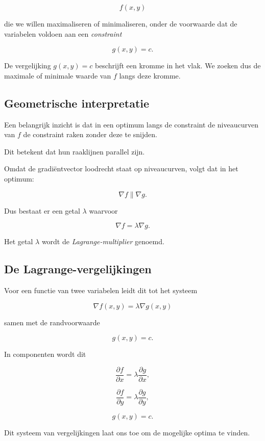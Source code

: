 \documentclass[11pt,a4paper]{article}
\begin{document}
    \[
        f(x,y)
    \]

    die we willen maximaliseren of minimaliseren,
    onder de voorwaarde dat de variabelen voldoen aan een
    \textit{constraint}

    \[
        g(x,y) = c.
    \]

    De vergelijking $g(x,y)=c$ beschrijft een kromme in het vlak.
    We zoeken dus de maximale of minimale waarde van $f$ langs deze kromme.

    \subsection{Geometrische interpretatie}

    Een belangrijk inzicht is dat in een optimum langs de constraint
    de niveaucurven van $f$ de constraint raken zonder deze te snijden.

    Dit betekent dat hun raaklijnen parallel zijn.

    Omdat de gradiëntvector loodrecht staat op niveaucurven,
    volgt dat in het optimum:

    \[
        \nabla f \parallel \nabla g.
    \]

    Dus bestaat er een getal $\lambda$ waarvoor

    \[
        \nabla f = \lambda \nabla g.
    \]

    Het getal $\lambda$ wordt de \textit{Lagrange-multiplier} genoemd.

    \subsection{De Lagrange-vergelijkingen}

    Voor een functie van twee variabelen leidt dit tot het systeem

    \[
        \nabla f(x,y) = \lambda \nabla g(x,y)
    \]

    samen met de randvoorwaarde

    \[
        g(x,y)=c.
    \]

    In componenten wordt dit

    \[
        \frac{\partial f}{\partial x}
        =
        \lambda
        \frac{\partial g}{\partial x},
    \]

    \[
        \frac{\partial f}{\partial y}
        =
        \lambda
        \frac{\partial g}{\partial y},
    \]

    \[
        g(x,y) = c.
    \]

    Dit systeem van vergelijkingen laat ons toe om de mogelijke
    optima te vinden.
\end{document}
